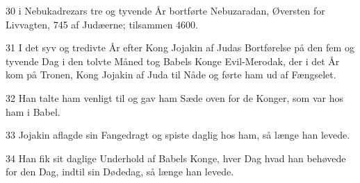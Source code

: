 \par 30 i Nebukadrezars tre og tyvende År bortførte Nebuzaradan, Øversten for Livvagten, 745 af Judæerne; tilsammen 4600.
\par 31 I det syv og tredivte År efter Kong Jojakin af Judas Bortførelse på den fem og tyvende Dag i den tolvte Måned tog Babels Konge Evil-Merodak, der i det År kom på Tronen, Kong Jojakin af Juda til Nåde og førte ham ud af Fængselet.
\par 32 Han talte ham venligt til og gav ham Sæde oven for de Konger, som var hos ham i Babel.
\par 33 Jojakin aflagde sin Fangedragt og spiste daglig hos ham, så længe han levede.
\par 34 Han fik sit daglige Underhold af Babels Konge, hver Dag hvad han behøvede for den Dag, indtil sin Dødedag, så længe han levede.


